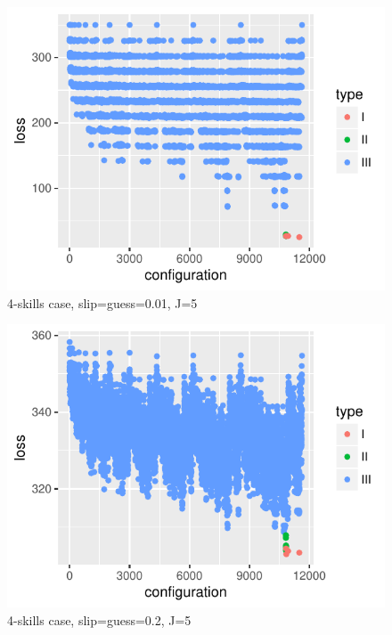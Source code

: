 \documentclass{edm_template}
\begin{document}
\begin{figure}[h!]
  \begin{center}
  \includegraphics[width=\columnwidth]{simResults/Skill4LossBestConfig_theta001_J5.pdf}
  \end{center}
  \caption{4-skills case, slip=guess=0.01, J=5}  
  \label{fig:theta001J5FourSkill}
\end{figure}

\begin{figure}[h!]
  \begin{center}
  \includegraphics[width=\columnwidth]{simResults/Skill4LossBestConfig_theta02_J5.pdf}
  \end{center}
  \caption{4-skills case, slip=guess=0.2, J=5}  
  \label{fig:theta02J5FourSkill}
\end{figure}
\end{document}
